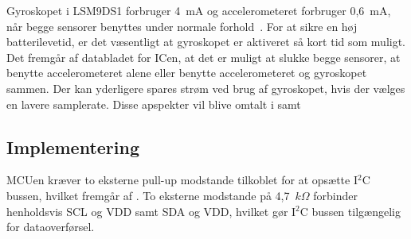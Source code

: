 Gyroskopet i LSM9DS1 forbruger 4~mA og accelerometeret forbruger 0,6~mA, når begge sensorer benyttes under normale forhold~\citep{Jimb02016}. For at sikre en høj batterilevetid, er det væsentligt at gyroskopet er aktiveret så kort tid som muligt. Det fremgår af databladet for ICen, at det er muligt at slukke begge sensorer, at benytte accelerometeret alene eller benytte accelerometeret og gyroskopet sammen. Der kan yderligere spares strøm ved brug af gyroskopet, hvis der vælges en lavere samplerate. Disse apspekter vil blive omtalt i  samt  %
 
\subsection{Implementering}
MCUen kræver to eksterne pull-up modstande tilkoblet for at opsætte I$^{2}$C bussen, hvilket fremgår af . To eksterne modstande på 4,7~$k\Omega$ forbinder henholdsvis SCL og VDD samt SDA og VDD, hvilket gør I$^{2}$C bussen tilgængelig for dataoverførsel.


